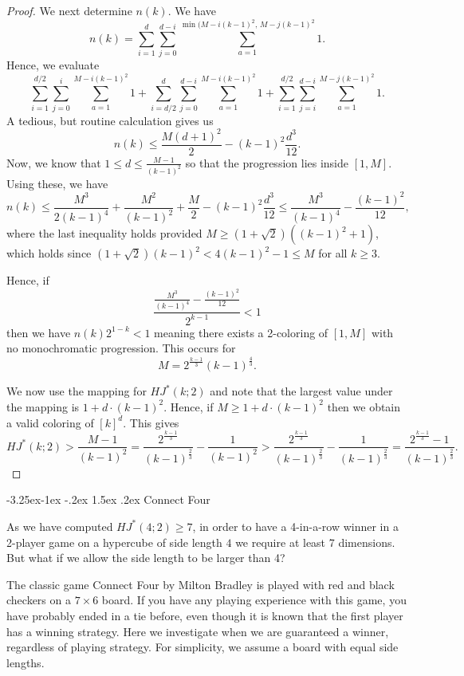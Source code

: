 \documentclass[11pt]{article}
\makeatletter
\theoremstyle{definition}
\renewcommand\subsection{\@startsection{subsection}{2}{\z@}%
{-3.25ex\@plus -1ex \@minus -.2ex}%
{1.5ex \@plus .2ex}%
{\normalfont\normalsize\bfseries}}
\makeatother
\begin{document}
\begin{proof}
We next determine $n(k)$.  We have
$$
n(k) = \sum_{i=1}^d \sum_{j=0}^{d-i} \sum_{a=1}^{\min(M-i(k-1)^2,\, M-j(k-1)^2} 1.
$$
Hence, we evaluate
$$
\sum_{i=1}^{d/2} \sum_{j=0}^{i} \sum_{a=1}^{M-i(k-1)^2} 1 + \sum_{i=d/2}^{d} \sum_{j=0}^{d-i} \sum_{a=1}^{M-i(k-1)^2} 1+ \sum_{i=1}^{d/2} \sum_{j=i}^{d-i} \sum_{a=1}^{M-j(k-1)^2} 1.
$$
A tedious, but routine calculation gives us 
$$
n(k) \leq \frac{M(d+1)^2}{2} - (k-1)^2 \frac{d^3}{12}.
$$
Now, we know that $1 \leq d \leq \frac{M-1}{(k-1)^2}$ so that the progression lies inside $[1,M]$.  Using these, we have 
$$
n(k)\leq \frac{M^3}{2(k-1)^4}+\frac{M^2}{(k-1)^2} + \frac{M}{2} - (k-1)^2 \frac{d^3}{12} \leq \frac{M^3}{(k-1)^4} -  \frac{(k-1)^2}{12},
$$
where the last inequality holds
provided $M\geq (1+\sqrt{2})((k-1)^2+1)$, which holds since $(1+\sqrt{2})(k-1)^2 < 4(k-1)^2-1
\leq M$
for all $k \geq 3$.

Hence, if 
$$
 \frac{\frac{M^3}{(k-1)^4} -  \frac{(k-1)^2}{12}}{2^{k-1} }< 1
$$
then we have $n(k)2^{1-k} < 1$ meaning there exists a 2-coloring of $[1,M]$ with no monochromatic progression.  This occurs for
$$
M = 2^{\frac{k-1}{3}}(k-1)^{\frac43}.
$$


We now use the mapping for $HJ^*(k;2)$ and note that the largest value under the mapping is $1+d \cdot (k-1)^2$.
Hence, if
$M \geq 1+ d \cdot (k-1)^2$ then we obtain a valid coloring of $[k]^d$.  This gives
$$
HJ^*(k;2) > \frac{M-1}{(k-1)^2} = \frac{2^{\frac{k-1}{3}}}{(k-1)^{\frac23}}-\frac{1}{(k-1)^2}>
\frac{2^{\frac{k-1}{3}}}{(k-1)^{\frac23}}-\frac{1}{(k-1)^{\frac23}} =\frac{2^{\frac{k-1}{3}}-1}{(k-1)^{\frac23}}.
$$
\end{proof}


\subsection{Connect Four}



As we have computed $HJ^*(4;2) \geq 7$, in order to
have a 4-in-a-row winner in a 2-player game on a hypercube of side length $4$
we require at least 7 dimensions.  But what if we
allow the side length to be larger than 4?

The classic game Connect Four by Milton Bradley is played with red and black
checkers on a $7 \times 6$ board.  If you have any playing
experience with this game, you have probably ended in a
tie before, even though it is known \cite{Allis} that the
first player has a winning strategy.  Here we investigate when
we are guaranteed a winner, regardless of playing strategy.
For simplicity, we assume a board with equal side lengths.
\end{document}
